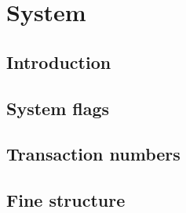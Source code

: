
\section{System}
\subsection{Introduction}               \label{hub: system: intro}               
\subsection{System flags}               \label{hub: system: system flags}        
\subsection{Transaction numbers}        \label{hub: system: transaction numbers} 
\subsection{Fine structure}             \label{hub: system: fine structure}      
